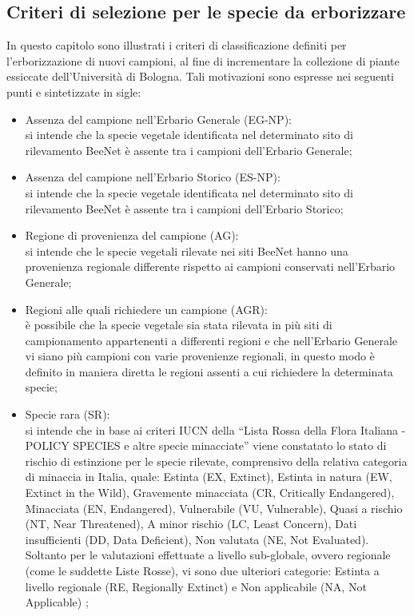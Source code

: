 \documentclass[main.tex]{subfiles}
\begin{document}
\subsection{Criteri di selezione per le specie da erborizzare}\label{Cap. 2.4}

In questo capitolo sono illustrati i criteri di classificazione definiti per l’erborizzazione di nuovi campioni, al fine di incrementare la collezione di piante essiccate dell’Università di Bologna. Tali motivazioni sono espresse nei seguenti punti e sintetizzate in sigle:

\begin{itemize}
 \item Assenza del campione nell’Erbario Generale (EG-NP):\\
si intende che la specie vegetale identificata nel determinato sito di rilevamento BeeNet è assente tra i campioni dell’Erbario Generale;
 \item Assenza del campione nell’Erbario Storico (ES-NP):\\
si intende che la specie vegetale identificata nel determinato sito di rilevamento BeeNet è assente tra i campioni dell’Erbario Storico;
 \item Regione di provenienza del campione (AG):\\
si intende che le specie vegetali rilevate nei siti BeeNet hanno una provenienza regionale differente rispetto ai campioni conservati nell’Erbario Generale;
 \item Regioni alle quali richiedere un campione (AGR):\\
è possibile che la specie vegetale sia stata rilevata in più siti di campionamento appartenenti a differenti regioni e che nell’Erbario Generale vi siano più campioni con varie provenienze regionali, in questo modo è definito in maniera diretta le regioni assenti a cui richiedere la determinata specie;
 \item Specie rara (SR):\\
si intende che in base ai criteri IUCN della “Lista Rossa della Flora Italiana - POLICY SPECIES e altre specie minacciate” viene constatato lo stato di rischio di estinzione per le specie rilevate, comprensivo della relativa categoria di minaccia in Italia, quale: Estinta (EX, Extinct), Estinta in natura (EW, Extinct in the Wild), Gravemente minacciata (CR, Critically Endangered), Minacciata (EN, Endangered), Vulnerabile (VU, Vulnerable), Quasi a rischio (NT, Near Threatened), A minor rischio (LC, Least Concern), Dati insufficienti (DD, Data Deficient), Non valutata (NE, Not Evaluated). Soltanto per le valutazioni effettuate a livello sub-globale, ovvero regionale (come le suddette Liste Rosse), vi sono due ulteriori categorie: Estinta a livello regionale (RE, Regionally Extinct) e Non applicabile (NA, Not Applicable) \citep{rossi};

\end{itemize}
\end{document}
